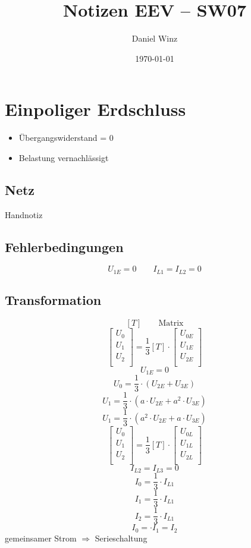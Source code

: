\documentclass[a4,paper,fleqn]{article}
\title{Notizen EEV -- SW07}
\date{\today}
\author{Daniel Winz}
\begin{document}
\maketitle
\clearpage

\section{Einpoliger Erdschluss}
\begin{itemize}
    \item Übergangswiderstand = 0
    \item Belastung vernachlässigt
\end{itemize}

\subsection{Netz}
Handnotiz

\subsection{Fehlerbedingungen}
\[ U_{1E} = 0 \qquad I_{L1} = I_{L2} = 0 \]

\subsection{Transformation}
\[ [T] \qquad \text{Matrix} \]
\[
\left[
    \begin{array}{l}
        U_0\\
        U_1\\
        U_2\\
    \end{array}
\right]
= \frac{1}{3} [T] \cdot
\left[
    \begin{array}{l}
        U_{0E}\\
        U_{1E}\\
        U_{2E}\\
    \end{array}
\right]
\]
\[ U_{1E} = 0 \]
\[ U_0 = \frac{1}{3} \cdot (U_{2E} + U_{3E}) \]
\[ U_1 = \frac{1}{3} \cdot (a \cdot U_{2E} + a^2 \cdot U_{3E}) \]
\[ U_1 = \frac{1}{3} \cdot (a^2 \cdot U_{2E} + a \cdot U_{3E}) \]
\[
\left[
    \begin{array}{l}
        U_0\\
        U_1\\
        U_2\\
    \end{array}
\right]
= \frac{1}{3} [T] \cdot
\left[
    \begin{array}{l}
        U_{0L}\\
        U_{1L}\\
        U_{2L}\\
    \end{array}
\right]
\]
\[ I_{L2} = I_{L3} = 0 \]
\[ I_0 = \frac{1}{3} \cdot I_{L1} \]
\[ I_1 = \frac{1}{3} \cdot I_{L1} \]
\[ I_2 = \frac{1}{3} \cdot I_{L1} \]
\[ I_0 = \cdot I_1 = I_2 \]
gemeinsamer Strom $\Rightarrow$ Serieschaltung
\end{document}
